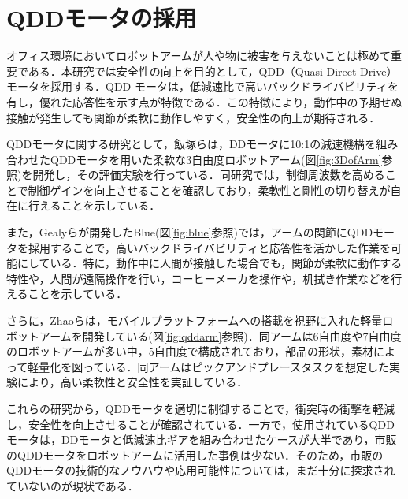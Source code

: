 
\section{QDDモータの採用}
オフィス環境においてロボットアームが人や物に被害を与えないことは極めて重要である．本研究では安全性の向上を目的として，QDD（Quasi Direct Drive）モータを採用する．QDD モータは，低減速比で高いバックドライバビリティを有し，優れた応答性を示す点が特徴である．この特徴により，動作中の予期せぬ接触が発生しても関節が柔軟に動作しやすく，安全性の向上が期待される．

QDDモータに関する研究として，飯塚ら\cite{飯塚浩太2021}は，DDモータに10:1の減速機構を組み合わせたQDDモータを用いた柔軟な3自由度ロボットアーム(図\ref{fig:3DofArm}参照)を開発し，その評価実験を行っている．同研究では，制御周波数を高めることで制御ゲインを向上させることを確認しており，柔軟性と剛性の切り替えが自在に行えることを示している．

また，Gealyら\cite{gealy2019}が開発したBlue(図\ref{fig:blue}参照)では，アームの関節にQDDモータを採用することで，高いバックドライバビリティと応答性を活かした作業を可能にしている．特に，動作中に人間が接触した場合でも，関節が柔軟に動作する特性や，人間が遠隔操作を行い，コーヒーメーカを操作や，机拭き作業などを行えることを示している\cite{Blue:online}．

さらに，Zhaoら\cite{10106520}は，モバイルプラットフォームへの搭載を視野に入れた軽量ロボットアームを開発している(図\ref{fig:qddarm}参照)．同アームは6自由度や7自由度のロボットアームが多い中，5自由度で構成されており，部品の形状，素材によって軽量化を図っている．同アームはピックアンドプレースタスクを想定した実験により，高い柔軟性と安全性を実証している．

これらの研究から，QDDモータを適切に制御することで，衝突時の衝撃を軽減し，安全性を向上させることが確認されている．一方で，使用されているQDDモータは，DDモータと低減速比ギアを組み合わせたケースが大半であり，市販のQDDモータをロボットアームに活用した事例は少ない．そのため，市販のQDDモータの技術的なノウハウや応用可能性については，まだ十分に探求されていないのが現状である．

